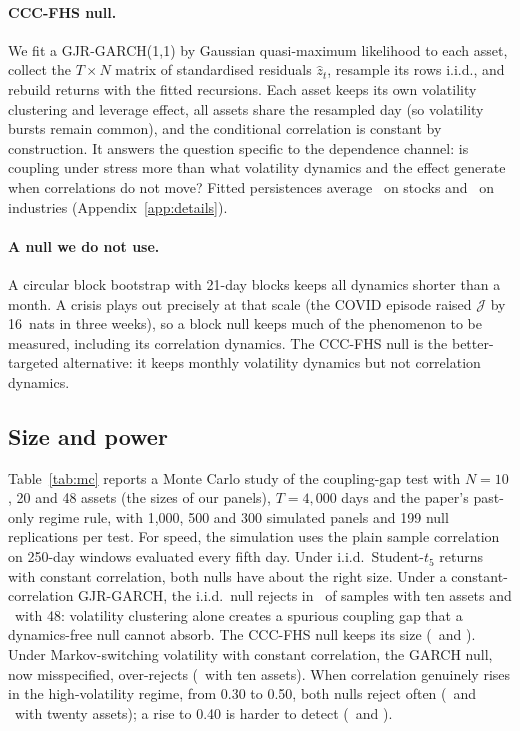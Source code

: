 \documentclass[12pt]{article}
\theoremstyle{definition}
\theoremstyle{remark}
\newcommand{\JJ}{\mathcal{J}}
\begin{document}
\begin{doublespace}
\paragraph{CCC-FHS null.} We fit a GJR-GARCH(1,1) by Gaussian quasi-maximum
likelihood to each asset, collect the $T\times N$ matrix of standardised
residuals $\hat z_t$, resample its rows i.i.d., and rebuild returns with the
fitted recursions. Each asset keeps its own volatility clustering and leverage
effect, all assets share the resampled day (so volatility bursts remain
common), and the conditional correlation is constant by construction. It
answers the question specific to the dependence channel: is coupling under
stress more than what volatility dynamics and the \citet{forbes2002} effect
generate when correlations do not move? Fitted persistences average
\gjrSpPers\ on stocks and \gjrFfPers\ on industries (Appendix~\ref{app:details}).

\paragraph{A null we do not use.} A circular block bootstrap with 21-day blocks
keeps all dynamics shorter than a month. A crisis plays out precisely at that
scale (the COVID episode raised $\JJ$ by 16~nats in three weeks), so a block
null keeps much of the phenomenon to be measured, including its correlation
dynamics. The CCC-FHS null is the better-targeted alternative: it keeps
monthly volatility dynamics but not correlation dynamics.

\subsection{Size and power}

Table~\ref{tab:mc} reports a Monte Carlo study of the coupling-gap test
with $N=10$, 20 and 48 assets (the sizes of our panels), $T=4{,}000$ days and
the paper's past-only regime rule, with 1,000, 500 and 300 simulated panels
and 199 null replications per test. For speed, the simulation uses the plain
sample correlation on 250-day windows evaluated every fifth day. Under
i.i.d.\ Student-$t_5$ returns with constant correlation, both nulls have about
the right size. Under a constant-correlation GJR-GARCH, the i.i.d.\ null
rejects in \mcGarchIidTen\ of samples with ten assets and \mcGarchIidFortyEight\
with 48: volatility clustering alone creates a spurious coupling gap that a
dynamics-free null cannot absorb. The CCC-FHS null keeps its size
(\mcGarchFhsTen\ and \mcGarchFhsFortyEight). Under Markov-switching volatility
with constant correlation, the GARCH null, now misspecified, over-rejects
(\mcMsvolFhsTen\ with ten assets). When correlation genuinely rises in the
high-volatility regime, from 0.30 to 0.50, both nulls reject often
(\mcPowIidTwenty\ and \mcPowFhsTwenty\ with twenty assets); a rise to 0.40 is
harder to detect (\mcPowSmallIidTwenty\ and \mcPowSmallFhsTwenty).


\end{doublespace}
\end{document}
